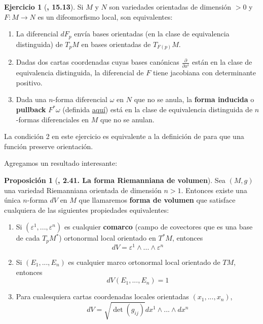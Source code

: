 \documentclass[spanish]{book}
\theoremstyle{definition}
\newtheorem*{prop}{Proposición}
\newtheorem*{ejer*}{Ejercicio}
\begin{document}
	\begin{ejer*}[\cite{Lee}\textbf{, 15.13}]
		Si $M$ y $N$ son variedades orientadas de dimensión $>0$ y ${F:M\to N}$ es un difeomorfismo local, son equivalentes:
		\begin{enumerate}
			\item La diferencial $dF_p$ envía bases orientadas (en la clase de equivalencia distinguida) de $T_pM$ en bases orientadas de $T_{F(p)}M$.
			\item Dadas dos cartas coordenadas cuyas bases canónicas $\frac{\partial}{\partial x^i}$ están en la clase de equivalencia distinguida, la diferencial de $F$ tiene jacobiana con determinante positivo.
			\item Dada una $n$-forma diferencial $\omega$ en $N$ que no se anula, la \textbf{forma inducida} o \textbf{pullback} $F^*\omega$ (definida \hyperref[pullback]{aquí}) está en la clase de equivalencia distinguida de $n$-formas diferenciales en $M$ que no se anulan.
		\end{enumerate}
	\end{ejer*}
	
	La condición 2 en este ejercicio es equivalente a la definición de \cite{DoCarmo} para que una función preserve orientación.
	
	Agregamos un resultado interesante:
	\begin{prop}[\cite{Lee-riem}\textbf{, 2.41. La forma Riemanniana de volumen}]
		
		Sea $(M,g)$ una variedad Riemanniana orientada de dimensión $n>1$. Entonces existe una única $n$-forma $dV$ en $M$ que llamaremos \textbf{forma de volumen} que satisface cualquiera de las siguientes propiedades equivalentes:
		
			\begin{enumerate}[label={(\arabic*)}]
			\item Si $(\varepsilon^1,...,\varepsilon^n)$ es cualquier \textbf{comarco} (campo de covectores que es una base de cada $T_pM^*$) ortonormal local orientado en $T^*M$, entonces
			\[dV=\varepsilon^1\wedge...\wedge\varepsilon^n\]
			\item Si $(E_1,...,E_n)$ es cualquier marco ortonormal local orientado de $TM$, entonces
			\[dV(E_1,...,E_n)=1\]
			\item Para cualesquiera cartas coordenadas locales orientadas $(x_1,...,x_n)$,
			$$dV=\sqrt{\det (g_{ij})}dx^1\wedge...\wedge dx^n$$
		\end{enumerate}
	\end{prop}
\end{document}
